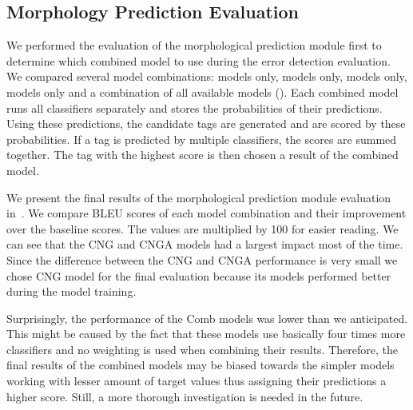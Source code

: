 \subsection{Morphology Prediction Evaluation}

We performed the evaluation of the morphological prediction module first to determine
which combined model to use during the error detection evaluation. We compared
several model combinations:  models only,  models only,  models only, 
 models only and a combination of all available models ().
Each combined model runs all classifiers separately and stores the probabilities of their
predictions. Using these predictions, the candidate tags are generated and are scored by 
these probabilities. If a tag is predicted by multiple classifiers, the scores are summed together.
The tag with the highest score is then chosen a result of the combined model.

We present the final results of the morphological prediction module evaluation in~.
We compare BLEU scores of each model combination and their improvement over the baseline scores.
The values are multiplied by 100 for easier reading. We can see that the CNG
and CNGA models had a largest impact most of the time. Since the difference between the CNG and CNGA
performance is very small we chose CNG model for the final evaluation because its models
performed better during the model training.

Surprisingly, the performance of the Comb models was lower than we anticipated. This might be caused
by the fact that these models use basically four times more classifiers and no weighting is used
when combining their results.
Therefore, the final results of the combined models may be biased towards the simpler models working
with lesser amount of target values thus assigning their predictions a higher score. Still, a more thorough
investigation is needed in the future.

